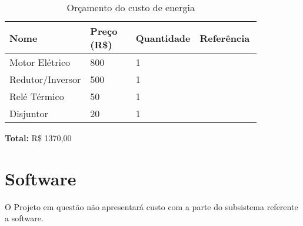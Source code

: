 \begin{table}[!htp]
\centering
\caption{Orçamento do custo de energia}
\label{my-label}
\begin{tabular}{|p{0.20\linewidth}|p{0.20\linewidth}|p{0.20\linewidth}|p{0.25\linewidth}|}
\hline
\multicolumn{1}{|l|}{\textbf{Nome}} & \multicolumn{1}{l|}{\textbf{Preço (R\$)}} & \multicolumn{1}{l|}{\textbf{Quantidade}} & \multicolumn{1}{l|}{\textbf{Referência}}                                                                                                                                  \\ \hline
Motor Elétrico                      & 800                                       & 1                                        & \cite{mercadolivre1} \\ \hline
Redutor/Inversor                    & 500                                       & 1                                        & \cite{mercadolivre2} \\ \hline
Relé Térmico                        & 50                                        & 1                                        & \cite{mercadolivre3} \\ \hline
Disjuntor                           & 20                                        & 1                                        &  \cite{mercadolivre4}                \\ \hline
\end{tabular}
\end{table}

\textbf{Total: } R\$ 1370,00

\section{Software}
    O Projeto em questão não apresentará custo com a parte do subsistema referente a software.
